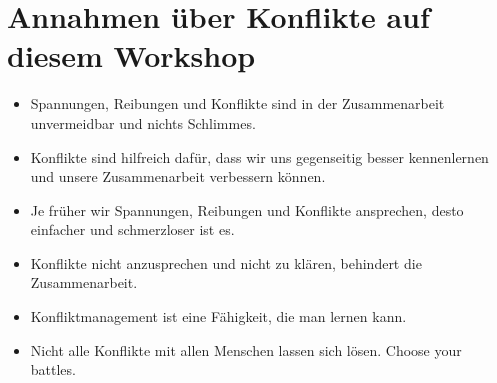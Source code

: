 \section{Annahmen über Konflikte auf diesem Workshop}
\label{konflikte-annahmen}

\begin{itemize}
  \item Spannungen, Reibungen und Konflikte sind in der Zusammenarbeit unvermeidbar und nichts Schlimmes.
  \item Konflikte sind hilfreich dafür, dass wir uns gegenseitig besser kennenlernen und unsere Zusammenarbeit verbessern können.
  \item Je früher wir Spannungen, Reibungen und Konflikte ansprechen, desto einfacher und schmerzloser ist es.
  \item Konflikte nicht anzusprechen und nicht zu klären, behindert die Zusammenarbeit.
  \item Konfliktmanagement ist eine Fähigkeit, die man lernen kann.
  \item Nicht alle Konflikte mit allen Menschen lassen sich lösen. Choose your battles.
\end{itemize}
